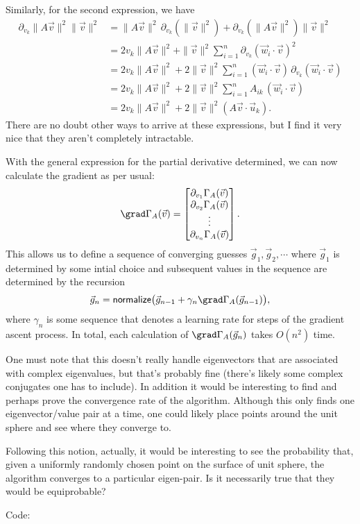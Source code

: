 \documentclass[a4paper, 12pt]{article}
\begin{document}
Similarly, for the second expression, we have
\begin{align*}
    \partial_{v_k} \| A \vec{v} \|^2 \| \vec{v} \|^2 &= \| A \vec{v} \|^2 \, \partial_{v_k} \left( \| \vec{v} \|^2 \right) + \partial_{v_k} \left( \| A \vec{v} \|^2 \right) \| \vec{v} \|^2 \\
    &= 2 v_k \| A \vec{v} \|^2 + \| \vec{v} \|^2 \sum_{i = 1}^{n} \partial_{v_k} (\vec{w}_i \cdot \vec{v})^2 \\
    &= 2 v_k \| A \vec{v} \|^2 + 2 \| \vec{v} \|^2 \sum_{i = 1}^{n} (\vec{w}_i \cdot \vec{v}) \, \partial_{v_k} (\vec{w}_i \cdot \vec{v}) \\
    &= 2 v_k \| A \vec{v} \|^2 + 2 \| \vec{v} \|^2 \sum_{i = 1}^{n} A_{ik} \, (\vec{w}_i \cdot \vec{v}) \\
    &= 2 v_k \| A \vec{v} \|^2 + 2 \| \vec{v} \|^2 (A \vec{v} \cdot \vec{u}_k)
.\end{align*}
There are no doubt other ways to arrive at these expressions, but I find it very nice that they aren't completely intractable.

With the general expression for the partial derivative determined, we can now calculate the gradient as per usual:
\[
    \grad \Gamma_A (\vec{v}) = \begin{bmatrix}
        \partial_{v_1} \Gamma_A (\vec{v}) \\
        \partial_{v_2} \Gamma_A (\vec{v}) \\
        \vdots \\
        \partial_{v_n} \Gamma_A (\vec{v})
    \end{bmatrix}
.\]
This allows us to define a sequence of converging guesses \( \vec{g}_1, \vec{g}_2, \cdots \) where \( \vec{g}_1 \) is determined by some intial choice and subsequent values in the sequence are determined by the recursion
\[
    \vec{g}_n = \textsf{normalize} \bigl(\vec{g}_{n-1} + \gamma_n \grad \Gamma_A (\vec{g}_{n-1}) \bigr)
,\]
where \( \gamma_n \) is some sequence that denotes a learning rate for steps of the gradient ascent process. In total, each calculation of \( \grad \Gamma_A (\vec{g}_n) \) takes \( O(n^2) \) time.

\begin{remark}
    One must note that this doesn't really handle eigenvectors that are
    associated with complex eigenvalues, but that's probably fine (there's
    likely some complex conjugates one has to include). In addition it would be
    interesting to find and perhaps prove the convergence rate of the
    algorithm. Although this only finds one eigenvector/value pair at a time,
    one could likely place points around the unit sphere and see where they
    converge to.

    Following this notion, actually, it would be interesting to see the
    probability that, given a uniformly randomly chosen point on the surface of
    unit sphere, the algorithm converges to a particular eigen-pair. Is it
    necessarily true that they would be equiprobable?
\end{remark}

Code:

\end{document}
